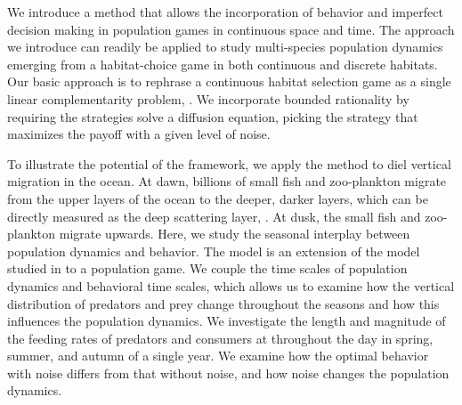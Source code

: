 We introduce a method that allows the incorporation of behavior and imperfect decision making in population games in continuous space and time. The approach we introduce can readily be applied to study multi-species population dynamics emerging from a habitat-choice game in both continuous and discrete habitats.  Our basic approach is to rephrase a continuous habitat selection game as a single linear complementarity problem, \citep{miller1991copositive}. We incorporate bounded rationality by requiring the strategies solve a diffusion equation, picking the strategy that maximizes the payoff with a given level of noise.


To illustrate the potential of the framework, we apply the method to diel vertical migration in the ocean. At dawn, billions of small fish and zoo-plankton migrate from the upper layers of the ocean to the deeper, darker layers, which can be directly measured as the deep scattering layer, \citep{sutton2013vertical, wang2014seasonal}. At dusk, the small fish and zoo-plankton migrate upwards. Here, we study the seasonal interplay between population dynamics and behavior. The model is an extension of the model studied in \citep{verticalmigration} to a population game. We couple the time scales of population dynamics and behavioral time scales, which allows us to examine how the vertical distribution of predators and prey change throughout the seasons and how this influences the population dynamics. We investigate the length and magnitude of the feeding rates of predators and consumers at throughout the day in spring, summer, and autumn of a single year. We examine how the optimal behavior with noise differs from that without noise, and how noise changes the population dynamics.


